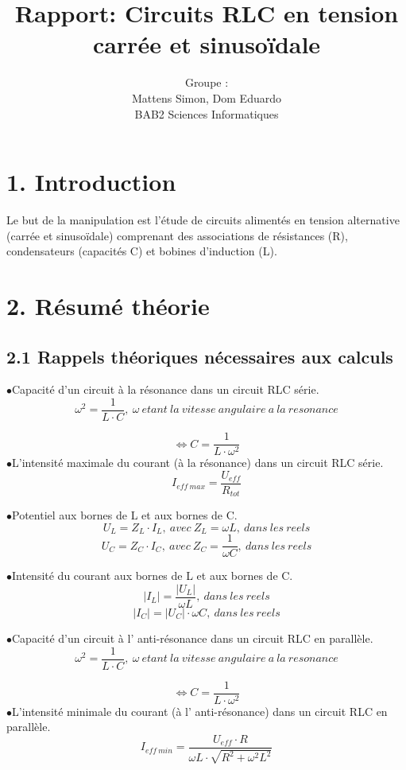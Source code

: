 \documentclass{report}
\title{Rapport: Circuits RLC en tension carrée et sinusoïdale}
\author{Groupe : \\ Mattens Simon, Dom Eduardo \\ BAB2 Sciences Informatiques}
\begin{document}
\maketitle

\section*{1. Introduction}

\hspace*{0,5cm} Le  but  de  la  manipulation  est  l'étude  de  circuits  alimentés  en  tension  alternative 
(carrée  et 
sinusoïdale) 
comprenant 
des  associations  de  résistances  (R),  condensateurs  (capacités  C)  et 
bobines d'induction (L).

\section*{2. R\'esum\'e th\'eorie}
\subsection*{2.1 Rappels th\'eoriques n\'ecessaires aux calculs}
$\bullet$Capacit\'e d'un circuit \`a la r\'esonance dans un circuit RLC s\'erie.
$$ \omega^{2} = \frac{1}{L \cdot C},\ \omega \ etant\ la\ vitesse\ angulaire\ a\ la\ resonance $$

$$ \Longleftrightarrow C = \frac{1}{L \cdot \omega^{2}} $$
$\bullet$L'intensit\'e maximale du courant (\`a la r\'esonance) dans un circuit RLC s\'erie.
$$ I_{eff\ max} = \frac{U_{eff}}{R_{tot}} $$ 

$\bullet$Potentiel aux bornes de L et aux bornes de C.
$$ U_{L} = Z_{L}\cdot I_{L},\ avec\ Z_{L} = \omega L,\ dans\ les\ reels $$ 
$$ U_{C} = Z_{C}\cdot I_{C},\ avec\ Z_{C} = \frac{1}{\omega C},\ dans\ les\ reels $$

$\bullet$Intensit\'e du courant aux bornes de L et aux bornes de C.
$$ \vert I_{L}\vert = \frac{\vert U_{L} \vert}{\omega L},\ dans\ les\ reels $$ 
$$ \vert I_{C}\vert = \vert U_{C} \vert \cdot \omega C,\ dans\ les\ reels $$

$\bullet$Capacit\'e d'un circuit \`a l' anti-r\'esonance dans un circuit RLC en parall\`ele.
$$ \omega^{2} = \frac{1}{L \cdot C},\ \omega \ etant\ la\ vitesse\ angulaire\ a\ la\ resonance $$

$$ \Longleftrightarrow C = \frac{1}{L \cdot \omega^{2}} $$
$\bullet$L'intensit\'e minimale du courant (\`a l' anti-r\'esonance) dans un circuit RLC en parall\`ele.
$$ I_{eff\ min} = \frac{U_{eff} \cdot R}{\omega L \cdot \sqrt{R^{2} + \omega^{2} L^{2}}} $$ 
\end{document}
